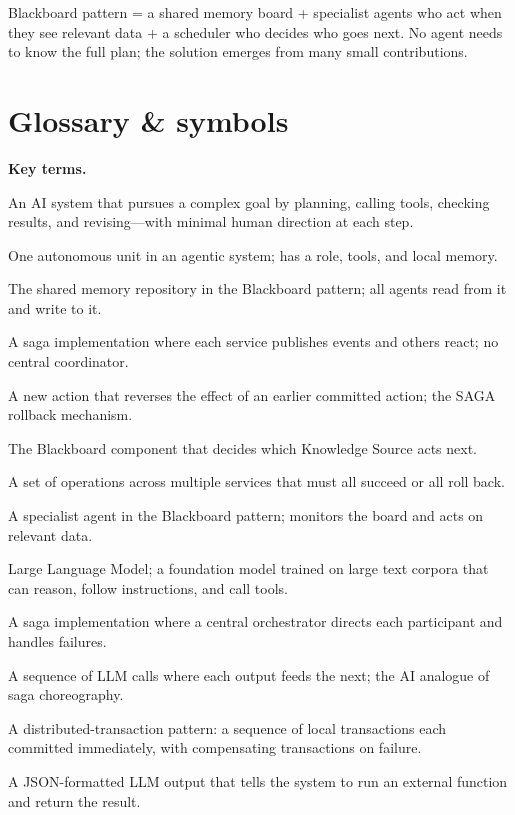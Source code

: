 \documentclass[a4paper,11pt]{article}
\begin{document}
\begin{keytake}
Blackboard pattern = a shared memory board + specialist agents who act when they see relevant data + a scheduler who decides who goes next.
No agent needs to know the full plan; the solution emerges from many small contributions.
\end{keytake}

\section*{Glossary \& symbols}

\noindent\textbf{Key terms.}
\begin{description}[leftmargin=9.5em,style=nextline,font=\normalfont\bfseries\color{navy}]
  \item[Agentic AI] An AI system that pursues a complex goal by planning, calling tools, checking results, and revising---with minimal human direction at each step.
  \item[Agent] One autonomous unit in an agentic system; has a role, tools, and local memory.
  \item[Blackboard] The shared memory repository in the Blackboard pattern; all agents read from it and write to it.
  \item[Choreography] A saga implementation where each service publishes events and others react; no central coordinator.
  \item[Compensating transaction] A new action that reverses the effect of an earlier committed action; the SAGA rollback mechanism.
  \item[Controller / Scheduler] The Blackboard component that decides which Knowledge Source acts next.
  \item[Distributed transaction] A set of operations across multiple services that must all succeed or all roll back.
  \item[Knowledge Source] A specialist agent in the Blackboard pattern; monitors the board and acts on relevant data.
  \item[LLM] Large Language Model; a foundation model trained on large text corpora that can reason, follow instructions, and call tools.
  \item[Orchestration] A saga implementation where a central orchestrator directs each participant and handles failures.
  \item[Prompt chaining] A sequence of LLM calls where each output feeds the next; the AI analogue of saga choreography.
  \item[SAGA] A distributed-transaction pattern: a sequence of local transactions each committed immediately, with compensating transactions on failure.
  \item[Tool call] A JSON-formatted LLM output that tells the system to run an external function and return the result.
\end{description}
\end{document}

